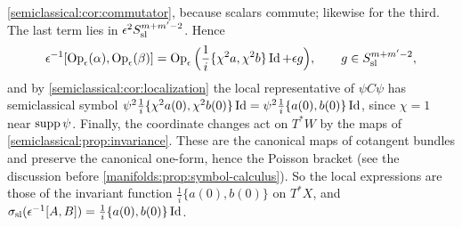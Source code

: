 \cref{semiclassical:cor:commutator}, because scalars commute; likewise for the third. The
last term lies in $\epsilon^2S^{m+m'-2}_{\mathrm{sl}}$. Hence
\begin{equation*}
\epsilon^{-1}[\operatorname{Op}_\epsilon(\alpha),\operatorname{Op}_\epsilon(\beta)]=\operatorname{Op}_\epsilon\Big(\frac1i\{\chi^2a,\chi^2b\}\operatorname{Id}+\epsilon g\Big),\qquad g\in S^{m+m'-2}_{\mathrm{sl}},
\end{equation*}
and by \cref{semiclassical:cor:localization} the local representative of $\psi C\psi$ has
semiclassical symbol $\psi^2\frac1i\{\chi^2a(0),\chi^2b(0)\}\operatorname{Id}=\psi^2\frac1i\{a(0),b(0)\}\operatorname{Id}$, since $\chi=1$ near
$\operatorname{supp}\psi$. Finally, the coordinate changes act on $T^*W$ by the maps of
\cref{semiclassical:prop:invariance}. These are the canonical maps of cotangent bundles and
preserve the canonical one-form, hence the Poisson bracket (see the discussion before
\cref{manifolds:prop:symbol-calculus}). So the local expressions are those of the invariant
function $\frac1i\{a(0),b(0)\}$ on $T^*X$, and $\sigma_{\mathrm{sl}}(\epsilon^{-1}[A,B])=\frac1i\{a(0),b(0)\}\operatorname{Id}$.
